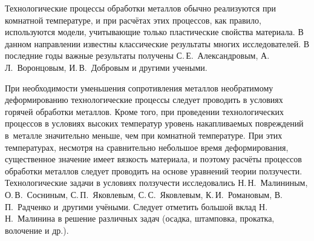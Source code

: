 

\date{20/VII/2010} %



\maketitle


Технологические процессы обработки металлов обычно реализуются при
комнатной температуре, и при расчётах этих процессов, как правило,
используются модели, учитывающие только пластические свойства
материала. В данном направлении известны классические результаты
многих исследователей. В последние годы важные результаты получены
С.\,Е.~Александровым, А.\,Л.~Воронцовым, И.\,В.~Добровым и другими
учеными.

При необходимости уменьшения сопротивления металлов необратимому деформированию технологические процессы следует проводить в
условиях горячей обработки металлов. Кроме того, при проведении технологических процессов в условиях высоких температур уровень
накапливаемых повреждений в~металле значительно меньше, чем при комнатной температуре. При этих температурах, несмотря на
сравнительно небольшое время деформирования, существенное значение имеет вязкость материала, и поэтому расчёты процессов
обработки металлов следует проводить на основе уравнений теории ползучести. Технологические задачи в условиях ползучести
исследовались Н.\,Н.~Малининым, О.\,В.~Сосниным, С.\,П.~Яковлевым, С.\,С.~Яковлевым, К.\,И.~Романовым, В.\,П.~Радченко и~другими
учёными. Следует отметить большой вклад Н.\,Н.~Малинина \cite{teraud11:1} в решение различных задач (осадка, штамповка, прокатка,
волочение и др.).

